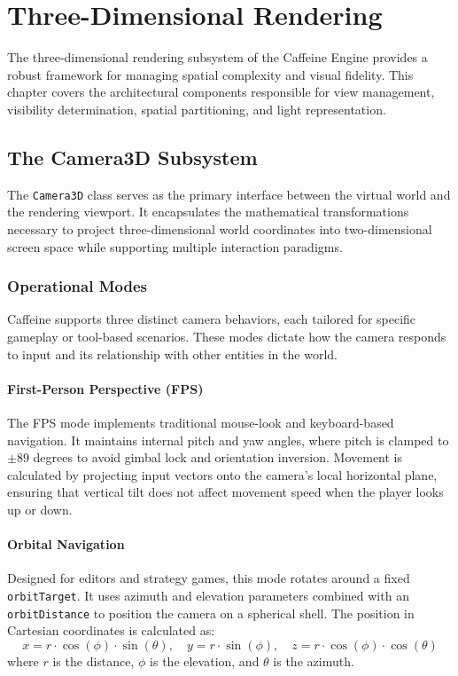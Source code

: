 \chapter{Three-Dimensional Rendering}

The three-dimensional rendering subsystem of the Caffeine Engine provides a robust framework for managing spatial complexity and visual fidelity. This chapter covers the architectural components responsible for view management, visibility determination, spatial partitioning, and light representation.

\section{The Camera3D Subsystem}

The \texttt{Camera3D} class serves as the primary interface between the virtual world and the rendering viewport. It encapsulates the mathematical transformations necessary to project three-dimensional world coordinates into two-dimensional screen space while supporting multiple interaction paradigms.

\subsection{Operational Modes}

Caffeine supports three distinct camera behaviors, each tailored for specific gameplay or tool-based scenarios. These modes dictate how the camera responds to input and its relationship with other entities in the world.

\subsubsection{First-Person Perspective (FPS)}
The FPS mode implements traditional mouse-look and keyboard-based navigation. It maintains internal pitch and yaw angles, where pitch is clamped to $\pm 89$ degrees to avoid gimbal lock and orientation inversion. Movement is calculated by projecting input vectors onto the camera's local horizontal plane, ensuring that vertical tilt does not affect movement speed when the player looks up or down.

\subsubsection{Orbital Navigation}
Designed for editors and strategy games, this mode rotates around a fixed \texttt{orbitTarget}. It uses azimuth and elevation parameters combined with an \texttt{orbitDistance} to position the camera on a spherical shell. The position in Cartesian coordinates is calculated as:
\begin{equation}
    x = r \cdot \cos(\phi) \cdot \sin(\theta), \quad y = r \cdot \sin(\phi), \quad z = r \cdot \cos(\phi) \cdot \cos(\theta)
\end{equation}
where $r$ is the distance, $\phi$ is the elevation, and $\theta$ is the azimuth.

